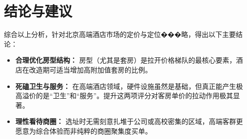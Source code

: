 \documentclass[a4paper, 11pt]{article}
\begin{document}
\section{结论与建议}
综合以上分析，针对北京高端酒店市场的定价与定位���略，得出以下主要结论：
\begin{itemize}
    \item \textbf{合理优化房型结构：} 房型（尤其是套房）是拉开价格梯队的最核心要素，酒店在改造期可适当增加高附加值套房的比例。
    \item \textbf{死磕卫生与服务：} 在高端酒店领域，硬件设施虽然是基础，但真正能产生极高溢价的是“卫生”和“服务”。提升这两项评分对客房单价的拉动作用极其显著。
    \item \textbf{理性看待商圈：} 选址时无需刻意扎堆于公司或高校密集的区域，高端客群更愿意为综合体验而非纯粹的商圈聚集度买单。
\end{itemize}

\appendix
\end{document}
